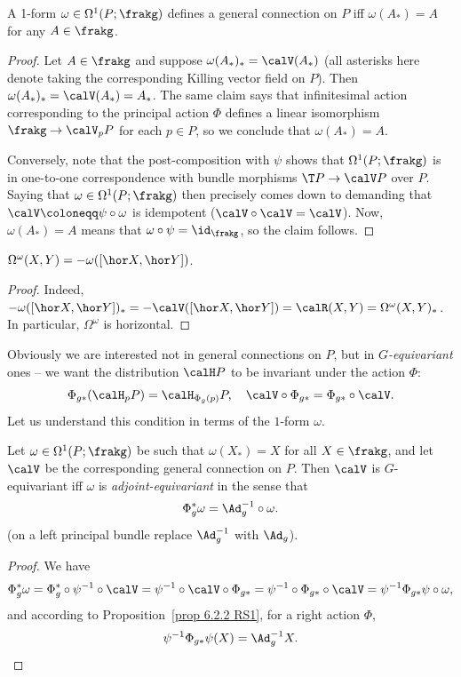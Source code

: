 \begin{prop}
    A 1-form $\omega\in\Omega^1(P;\frakg)$ defines a general connection on $P$ iff $\omega(A_\ast)=A$ for any $A\in\frakg$.
\end{prop}
\begin{proof}
    Let $A\in\frakg$ and suppose $\omega(A_\ast)_\ast=\calV(A_\ast)$ (all asterisks here denote taking the corresponding Killing vector field on $P$).  Then $\omega(A_\ast)_\ast=\calV(A_\ast)=A_\ast$. The same claim says that infinitesimal action corresponding to the principal action $\Phi$ defines a linear isomorphism $\frakg\to \calV_pP$ for each $p\in P$, so we conclude that $\omega(A_\ast)=A$. 

    Conversely, note that the post-composition with $\psi$ shows that $\Omega^1(P;\frakg)$ is in one-to-one correspondence with bundle morphisms $\T P\to \calV P$ over $P$. Saying that $\omega\in\Omega^1(P;\frakg)$ then precisely comes down to demanding that $\calV\coloneqq \psi\circ\omega$ is idempotent ($\calV\circ\calV=\calV$). Now, $\omega(A_\ast)=A$ means that $\omega\circ\psi=\id_\frakg$, so the claim follows.
\end{proof}
\begin{cor}\label{cor curvature 2-form}
    $\Omega^\omega(X,Y)=-\omega([\hor X,\hor Y])$.
\end{cor}
\begin{proof}
    Indeed, $-\omega([\hor X,\hor Y])_\ast=-\calV([\hor X,\hor Y])=\calR(X,Y)=\Omega^\omega(X,Y)_\ast$. In particular, $\Omega^\omega$ is horizontal.
\end{proof}

Obviously we are interested not in general connections on $P$, but in \emph{$G$-equivariant} ones -- we want the distribution $\calH P$ to be invariant under the action $\Phi$:
\[\Phi_{g\ast}(\calH_pP)=\calH_{\Phi_g(p)}P,\quad \calV\circ \Phi_{g\ast}=\Phi_{g\ast}\circ \calV.\]
Let us understand this condition in terms of the $1$-form $\omega$.

\begin{prop}
    Let $\omega\in\Omega^1(P;\frakg)$ be such that $\omega(X_\ast)=X$ for all $X\in\frakg$, and let $\calV$ be the corresponding general connection on $P$. Then $\calV$ is $G$-equivariant iff $\omega$ is \emph{adjoint-equivariant} in the sense that 
    \[\Phi_g^\ast\omega=\Ad_{g}^{-1}\circ\omega.\]
    (on a left principal bundle replace $\Ad_g^{-1}$ with $\Ad_g$).
\end{prop}
\begin{proof}
    We have
    \[\Phi^\ast_g\omega=\Phi^\ast_g\circ\psi^{-1}\circ \calV=\psi^{-1}\circ\calV\circ \Phi_{g\ast}=\psi^{-1}\circ\Phi_{g\ast}\circ\calV=\psi^{-1}\Phi_{g\ast}\psi\circ\omega,\]
    and according to Proposition~\ref{prop 6.2.2 RS1}, for a right action $\Phi$,
    \[\psi^{-1}\Phi_{g\ast}\psi(X)=\Ad_g^{-1}X.\]
\end{proof}


